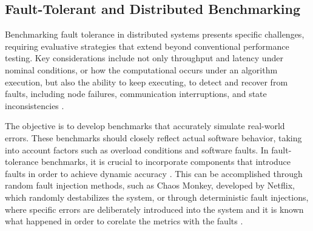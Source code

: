 \subsection{Fault-Tolerant and Distributed Benchmarking}

Benchmarking fault tolerance in distributed systems presents specific challenges, requiring evaluative strategies that extend beyond conventional performance testing. Key considerations include not only throughput and latency under nominal conditions, or how the computational occurs under an algorithm execution, but also the ability to keep executing, to detect and recover from faults, including node failures, communication interruptions, and state inconsistencies \cite{Randtoul2022, Blessing2019, Almeida2013}.

The objective is to develop benchmarks that accurately simulate real-world errors. These benchmarks should closely reflect actual software behavior, taking into account factors such as overload conditions and software faults. In fault-tolerance benchmarks, it is crucial to incorporate components that introduce faults in order to achieve dynamic accuracy \cite{Almeida2013}. This can be accomplished through random fault injection methods, such as Chaos Monkey, developed by Netflix, which randomly destabilizes the system, or through deterministic fault injections, where specific errors are deliberately introduced into the system and it is known what happened in order to corelate the metrics with the faults \cite{Randtoul2022}.

